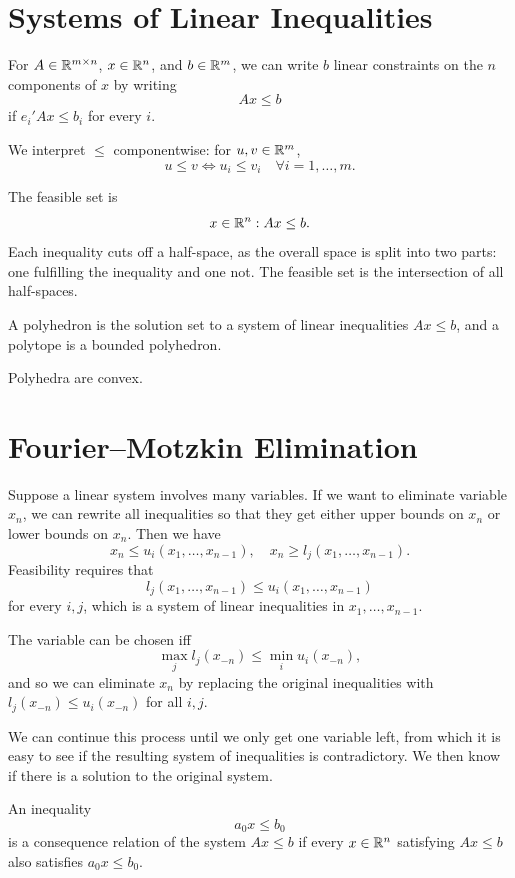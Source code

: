 
\section{Systems of Linear Inequalities}

For $A \in \mathbb{R}^{m\times n}$, $x \in \mathbb{R}^n$, and $b \in \mathbb{R}^m$, we can write $b$ linear constraints on the $n$ components of $x$ by writing \[
	Ax \le b
\] if $e_i' Ax \le b_i$ for every $i$.

We interpret $\le$ componentwise: for $u,v \in \mathbb{R}^m$,
\[
	u \le v \iff u_i \le v_i \quad \forall i=1,\ldots,m
.\]

The feasible set is \[
	x \in \mathbb{R}^n : Ax \le b
.\] Each inequality cuts off a half-space, as the overall space is split into two parts: one fulfilling the inequality and one not. The feasible set is the intersection of all half-spaces.

\begin{definition}
	A polyhedron is the solution set to a system of linear inequalities $Ax \le b$, and a polytope is a bounded polyhedron.
\end{definition}

Polyhedra are convex.

\section{Fourier--Motzkin Elimination}
Suppose a linear system involves many variables. If we want to eliminate variable $x_n$, we can rewrite all inequalities so that they get either upper bounds on $x_n$ or lower bounds on $x_n$. Then we have \[
	x_n \le u_i \left( x_1,\ldots,x_{n-1} \right), \quad x_n \ge l_j \left( x_1,\ldots,x_{n-1} \right)
.\] Feasibility requires that \[
	l_j\left( x_1,\ldots,x_{n-1} \right) \le u_i\left( x_1,\ldots,x_{n-1} \right)
\] for every $i,j$, which is a system of linear inequalities in $x_1,\ldots,x_{n-1}$.

The variable can be chosen iff \[
	\max_j l_j(x_{-n}) \le \min_i u_i(x_{-n})
,\] and so we can eliminate $x_n$ by replacing the original inequalities with $l_j(x_{-n}) \le u_i(x_{-n})$ for all $i,j$.

We can continue this process until we only get one variable left, from which it is easy to see if the resulting system of inequalities is contradictory. We then know if there is a solution to the original system.

\begin{definition}
	An inequality
	\[
		a_0 x \le b_0
	\]
	is a consequence relation of the system $Ax \le b$ if every $x \in \mathbb{R}^n$ satisfying $Ax \le b$ also satisfies $a_0 x \le b_0$.
\end{definition}

